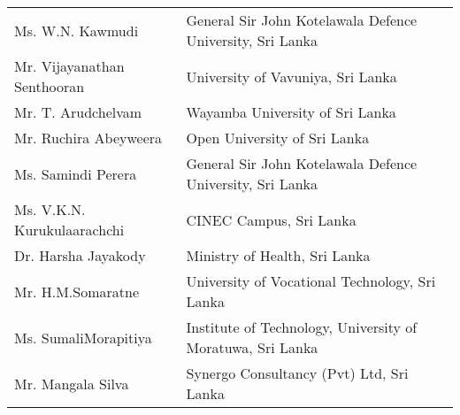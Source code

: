 \begin{longtable}{ L{4.8cm}  L{6.8cm} }
Ms. W.N. Kawmudi &  General Sir John Kotelawala Defence University, Sri Lanka\\
Mr. Vijayanathan Senthooran &  University of Vavuniya, Sri Lanka\\
Mr. T. Arudchelvam &  Wayamba University of Sri Lanka\\
Mr. Ruchira Abeyweera &  Open University of Sri Lanka\\
Ms. Samindi Perera &  General Sir John Kotelawala Defence University, Sri Lanka\\
Ms. V.K.N. Kurukulaarachchi &  CINEC Campus, Sri Lanka\\
Dr. Harsha Jayakody &  Ministry of Health, Sri Lanka\\
Mr. H.M.Somaratne &  University of Vocational Technology, Sri Lanka\\
Ms. SumaliMorapitiya &  Institute of Technology, University of Moratuwa, Sri Lanka\\
Mr. Mangala Silva &  Synergo Consultancy (Pvt) Ltd, Sri Lanka\\


\end{longtable}
